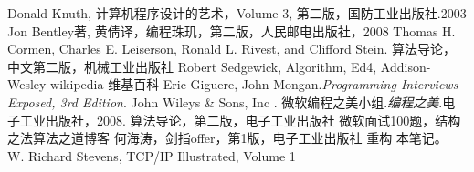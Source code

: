 \documentclass[11pt,a4paper]{report}
\begin{document}
\begin{thebibliography}{99}
     Donald Knuth, 计算机程序设计的艺术，Volume 3, 第二版，国防工业出版社.2003
     Jon Bentley著, 黄倩译，编程珠玑，第二版，人民邮电出版社，2008
     Thomas H. Cormen, Charles E. Leiserson, Ronald L. Rivest, and Clifford Stein. 算法导论，中文第二版，机械工业出版社
     Robert Sedgewick, Algorithm, Ed4, Addison-Wesley
    wikipedia 
     维基百科
     Eric Giguere, John Mongan.\emph{Programming Interviews Exposed, 3rd Edition}. John Wileys \& Sons, Inc .
     微软编程之美小组.\emph{编程之美}.电子工业出版社，2008.
     算法导论，第二版，电子工业出版社
    微软面试100题，结构之法算法之道博客
    何海涛，剑指offer，第1版，电子工业出版社
    重构
    本笔记。
    W. Richard Stevens, TCP/IP Illustrated, Volume 1

\end{thebibliography}
\end{document}
